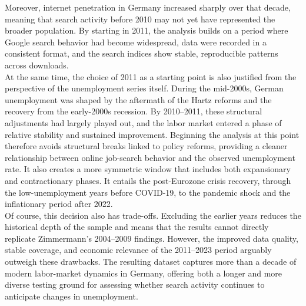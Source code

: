 \documentclass[12pt,a4paper]{article}
\begin{document}
Moreover, internet penetration in Germany increased sharply over that decade, meaning that search activity before 2010 may not yet have represented the broader population.
By starting in 2011, the analysis builds on a period where Google search behavior had become widespread, data were recorded in a consistent format, and the search indices show stable, reproducible patterns across downloads.\\
At the same time, the choice of 2011 as a starting point is also justified from the perspective of the unemployment series itself. During the mid-2000s, German unemployment was shaped by the aftermath of the Hartz reforms and the recovery from the early-2000s recession.
By 2010–2011, these structural adjustments had largely played out, and the labor market entered a phase of relative stability and sustained improvement. Beginning the analysis at this point therefore avoids structural breaks linked to policy reforms, providing a cleaner relationship between online job-search behavior and the observed unemployment rate.
It also creates a more symmetric window that includes both expansionary and contractionary phases. It entails the post-Eurozone crisis recovery, through the low-unemployment years before COVID-19, to the pandemic shock and the inflationary period after 2022.\\
Of course, this decision also has trade-offs. Excluding the earlier years reduces the historical depth of the sample and means that the results cannot directly replicate Zimmermann’s 2004–2009 findings.
However, the improved data quality, stable coverage, and economic relevance of the 2011–2023 period arguably outweigh these drawbacks.
The resulting dataset captures more than a decade of modern labor-market dynamics in Germany, offering both a longer and more diverse testing ground for assessing whether search activity continues to anticipate changes in unemployment.
\end{document}
